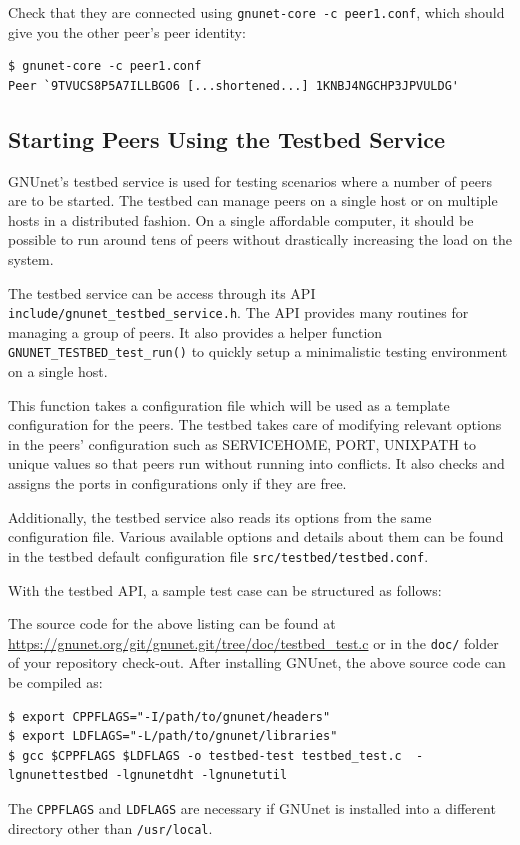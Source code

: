 \documentclass[10pt]{article}
\begin{document}
Check that they are connected using {\tt gnunet-core -c peer1.conf}, which should give you the other peer's
peer identity:
\lstset{language=bash}
\begin{lstlisting}
$ gnunet-core -c peer1.conf
Peer `9TVUCS8P5A7ILLBGO6 [...shortened...] 1KNBJ4NGCHP3JPVULDG'
\end{lstlisting}

\subsection{Starting Peers Using the Testbed Service}

GNUnet's testbed service is used for testing scenarios where a number of peers
are to be started.  The testbed can manage peers on a single host or on multiple
hosts in a distributed fashion.  On a single affordable computer, it should be
possible to run around tens of peers without drastically increasing the load on the
system.

The testbed service can be access through its API
\texttt{include/gnunet\_testbed\_service.h}.  The API provides many routines for
managing a group of peers.  It also provides a helper function
\texttt{GNUNET\_TESTBED\_test\_run()} to quickly setup a minimalistic testing
environment on a single host.

This function takes a configuration file which will be used as a template
configuration for the peers.  The testbed takes care of modifying relevant
options in the peers' configuration such as SERVICEHOME, PORT, UNIXPATH to
unique values so that peers run without running into conflicts.  It also checks
and assigns the ports in configurations only if they are free.

Additionally, the testbed service also reads its options from the same
configuration file.  Various available options and details about them can be
found in the testbed default configuration file \texttt{src/testbed/testbed.conf}.

With the testbed API, a sample test case can be structured as follows:
\lstset{language=C}

The source code for the above listing can be found at
\url{https://gnunet.org/git/gnunet.git/tree/doc/testbed_test.c}
or in the {\tt doc/} folder of your repository check-out.
After installing GNUnet, the above source code can be compiled as:
\lstset{language=bash}
\begin{lstlisting}
$ export CPPFLAGS="-I/path/to/gnunet/headers"
$ export LDFLAGS="-L/path/to/gnunet/libraries"
$ gcc $CPPFLAGS $LDFLAGS -o testbed-test testbed_test.c  -lgnunettestbed -lgnunetdht -lgnunetutil
\end{lstlisting}
The \texttt{CPPFLAGS} and \texttt{LDFLAGS} are necessary if GNUnet is installed
into a different directory other than \texttt{/usr/local}.
\end{document}
